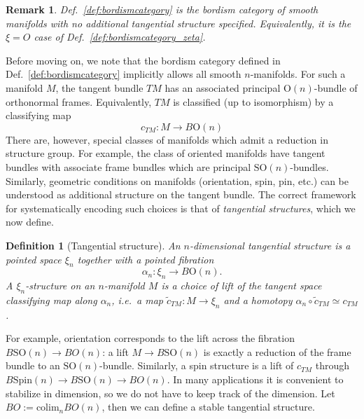 \documentclass[aps,prx,reprint,superscriptaddress,twocolumn,amsmath,amssymb,amsfonts, nofootinbib]{revtex4-2}
\newcommand{\SO}{\text{SO}}
\theoremstyle{apsstyle}
\newtheorem{definition}[theorem]{Definition}
\newtheorem{remark}[theorem]{Remark}
\begin{document}
\medskip 

\begin{remark}
Def.~\ref{def:bordismcategory} is the bordism category of smooth manifolds with no additional tangential structure specified. Equivalently, it is the $\xi=O$ case of Def.~\ref{def:bordismcategory_zeta}.
\end{remark}


\bigskip

Before moving on, we note that the bordism category defined in Def.~\ref{def:bordismcategory} implicitly allows all smooth $n$-manifolds. For such a manifold $M$, the tangent bundle $TM$ has an associated principal $\mathrm{O}(n)$-bundle of orthonormal frames. Equivalently, $TM$ is classified (up to isomorphism) by a classifying map
\begin{equation*}
    c_{TM}: M \to B\mathrm{O}(n)
\end{equation*}
There are, however, special classes of manifolds which admit a reduction in structure group. For example, the class of oriented manifolds have tangent bundles with associate frame bundles which are principal $\SO(n)$-bundles. Similarly, geometric conditions on manifolds (orientation, spin, pin, etc.) can be understood as additional structure on the tangent bundle. The correct framework for systematically encoding such choices is that of \emph{tangential structures}, which we now define.

\bigskip 

\begin{definition}[Tangential structure]
\label{def:tangential_structure_general}
An \emph{$n$-dimensional tangential structure} is a pointed space $\xi_n$
together with a pointed fibration
\begin{equation}
    \alpha_n:\xi_n \longrightarrow B\mathrm{O}(n).
\end{equation}
A \emph{$\xi_n$-structure} on an $n$-manifold $M$ is a choice of lift of the tangent space classifying map along $\alpha_n$, i.e.\ a map $\widetilde c_{TM}:M\to \xi_n$ and a homotopy $\alpha_n\circ \widetilde c_{TM}\simeq c_{TM}$.
\end{definition}

\bigskip 

\noindent For example, orientation corresponds to the lift across the fibration $B\SO(n)\rightarrow BO(n)$: a lift $M\to B\SO(n)$ is exactly a reduction of the frame bundle to an $\SO(n)$-bundle. Similarly, a spin structure is a lift of $c_{TM}$ through $B\mathrm{Spin}(n)\to B\SO(n)\rightarrow BO(n)$. In many applications it is convenient to stabilize in dimension, so we do not have to keep track of the dimension. Let $BO:=\mathrm{colim}_{n} BO(n)$, then we can define a stable tangential structure.
\end{document}
